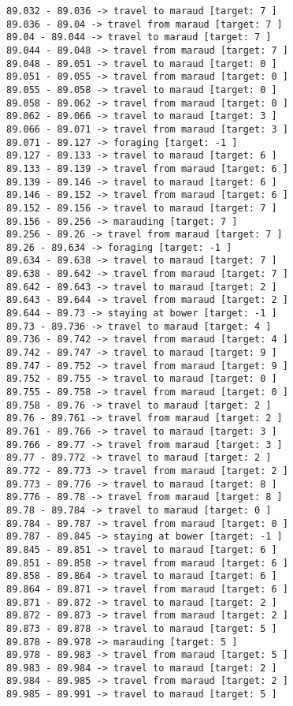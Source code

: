 \documentclass[11pt]{article}
\begin{document}
\begin{Verbatim}[commandchars=\\\{\}]
89.032 - 89.036 -> travel to maraud [target: 7 ]
89.036 - 89.04 -> travel from maraud [target: 7 ]
89.04 - 89.044 -> travel to maraud [target: 7 ]
89.044 - 89.048 -> travel from maraud [target: 7 ]
89.048 - 89.051 -> travel to maraud [target: 0 ]
89.051 - 89.055 -> travel from maraud [target: 0 ]
89.055 - 89.058 -> travel to maraud [target: 0 ]
89.058 - 89.062 -> travel from maraud [target: 0 ]
89.062 - 89.066 -> travel to maraud [target: 3 ]
89.066 - 89.071 -> travel from maraud [target: 3 ]
89.071 - 89.127 -> foraging [target: -1 ]
89.127 - 89.133 -> travel to maraud [target: 6 ]
89.133 - 89.139 -> travel from maraud [target: 6 ]
89.139 - 89.146 -> travel to maraud [target: 6 ]
89.146 - 89.152 -> travel from maraud [target: 6 ]
89.152 - 89.156 -> travel to maraud [target: 7 ]
89.156 - 89.256 -> marauding [target: 7 ]
89.256 - 89.26 -> travel from maraud [target: 7 ]
89.26 - 89.634 -> foraging [target: -1 ]
89.634 - 89.638 -> travel to maraud [target: 7 ]
89.638 - 89.642 -> travel from maraud [target: 7 ]
89.642 - 89.643 -> travel to maraud [target: 2 ]
89.643 - 89.644 -> travel from maraud [target: 2 ]
89.644 - 89.73 -> staying at bower [target: -1 ]
89.73 - 89.736 -> travel to maraud [target: 4 ]
89.736 - 89.742 -> travel from maraud [target: 4 ]
89.742 - 89.747 -> travel to maraud [target: 9 ]
89.747 - 89.752 -> travel from maraud [target: 9 ]
89.752 - 89.755 -> travel to maraud [target: 0 ]
89.755 - 89.758 -> travel from maraud [target: 0 ]
89.758 - 89.76 -> travel to maraud [target: 2 ]
89.76 - 89.761 -> travel from maraud [target: 2 ]
89.761 - 89.766 -> travel to maraud [target: 3 ]
89.766 - 89.77 -> travel from maraud [target: 3 ]
89.77 - 89.772 -> travel to maraud [target: 2 ]
89.772 - 89.773 -> travel from maraud [target: 2 ]
89.773 - 89.776 -> travel to maraud [target: 8 ]
89.776 - 89.78 -> travel from maraud [target: 8 ]
89.78 - 89.784 -> travel to maraud [target: 0 ]
89.784 - 89.787 -> travel from maraud [target: 0 ]
89.787 - 89.845 -> staying at bower [target: -1 ]
89.845 - 89.851 -> travel to maraud [target: 6 ]
89.851 - 89.858 -> travel from maraud [target: 6 ]
89.858 - 89.864 -> travel to maraud [target: 6 ]
89.864 - 89.871 -> travel from maraud [target: 6 ]
89.871 - 89.872 -> travel to maraud [target: 2 ]
89.872 - 89.873 -> travel from maraud [target: 2 ]
89.873 - 89.878 -> travel to maraud [target: 5 ]
89.878 - 89.978 -> marauding [target: 5 ]
89.978 - 89.983 -> travel from maraud [target: 5 ]
89.983 - 89.984 -> travel to maraud [target: 2 ]
89.984 - 89.985 -> travel from maraud [target: 2 ]
89.985 - 89.991 -> travel to maraud [target: 5 ]

\end{Verbatim}
\end{document}

